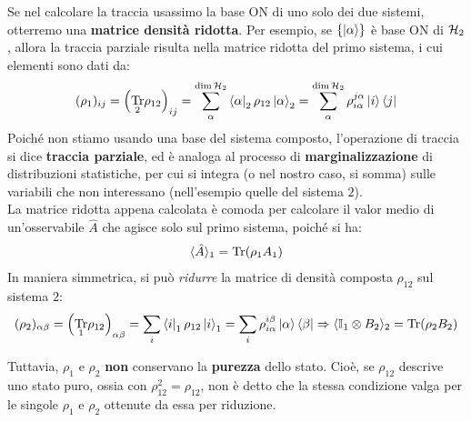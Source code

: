 \documentclass[../../InformazioneQuantistica.tex]{subfiles}
\begin{document}
Se nel calcolare la traccia usassimo la base ON di uno solo dei due sistemi, otterremo una \textbf{matrice densità ridotta}. Per esempio, se $\{\Ket{\alpha}\}$ è base ON di $\mathcal{H}_2$, allora la traccia parziale risulta nella matrice ridotta del primo sistema, i cui elementi sono dati da:
\begin{align*}
(\rho_1)_{ij} = \left(\underset{2}{\operatorname{Tr}}\rho_{12}\right)_{ij} =\sum_\alpha^{\operatorname{\dim}\mathcal{H}_2} \Bra{\alpha}_2 \rho_{12}\Ket{\alpha}_2 = \sum_\alpha^{\operatorname{dim}\mathcal{H}_2} \rho_{i\alpha}^{j\alpha} \Ket{i}\Bra{j}
\end{align*}
Poiché non stiamo usando una base del sistema composto, l'operazione di traccia si dice \textbf{traccia parziale}, ed è analoga al processo di \textbf{marginalizzazione} di distribuzioni statistiche, per cui si integra (o nel nostro caso, si somma) sulle variabili che non interessano (nell'esempio quelle del sistema $2$).\\
La matrice ridotta appena calcolata è comoda per calcolare il valor medio di un'osservabile $\hat{A}$ che agisce solo sul primo sistema, poiché si ha:
\begin{align*}
\langle \hat{A}\rangle_1 = \operatorname{Tr}(\rho_1 A_1)
\end{align*}
In maniera simmetrica, si può \textit{ridurre} la matrice di densità composta $\rho_{12}$ sul sistema $2$:
\begin{align*}
(\rho_2)_{\alpha\beta}= \left(\underset{1}{\operatorname{Tr}} \rho_{12}\right)_{\alpha\beta} = \sum_i \Bra{i}_1 \rho_{12}\Ket{i}_1 = \sum_i \rho_{i\alpha}^{i\beta} \Ket{\alpha}\Bra{\beta} \Rightarrow  \langle \mathbb{I}_1\otimes {B}_2\rangle_2 = \operatorname{Tr}(\rho_2 B_2)
\end{align*}

Tuttavia, $\rho_1$ e $\rho_2$ \textbf{non} conservano la \textbf{purezza} dello stato. Cioè, se $\rho_{12}$ descrive uno stato puro, ossia con $\rho_{12}^2 = \rho_{12}$, non è detto che la stessa condizione valga per le singole $\rho_1$ e $\rho_2$ ottenute da essa per riduzione.
\end{document}
